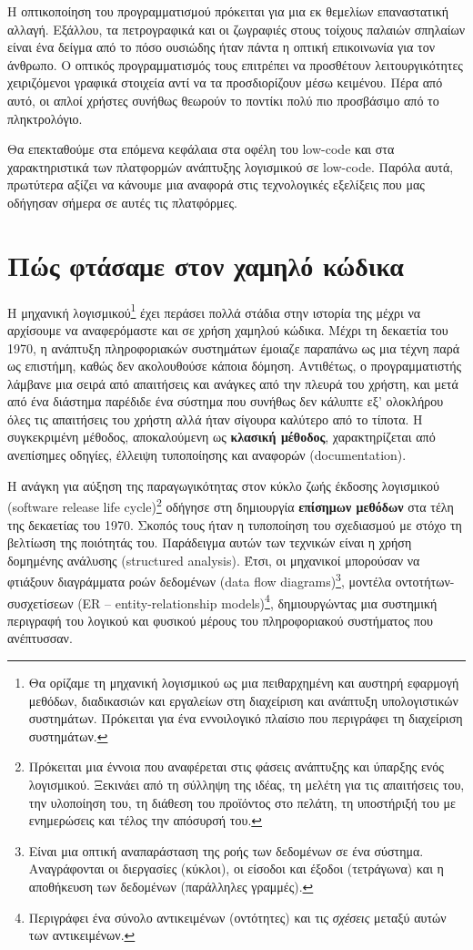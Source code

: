             Η οπτικοποίηση του προγραμματισμού πρόκειται για μια εκ θεμελίων επαναστατική αλλαγή. Εξάλλου, τα πετρογραφικά και οι ζωγραφιές στους τοίχους παλαιών σπηλαίων είναι ένα δείγμα από το πόσο ουσιώδης ήταν πάντα η οπτική επικοινωνία για τον άνθρωπο. \cite{CASEKuhn}  Ο οπτικός προγραμματισμός τους επιτρέπει να προσθέτουν λειτουργικότητες χειριζόμενοι γραφικά στοιχεία αντί να τα προσδιορίζουν μέσω κειμένου. Πέρα από αυτό, οι απλοί χρήστες συνήθως θεωρούν το ποντίκι πολύ πιο προσβάσιμο από το πληκτρολόγιο.

            Θα επεκταθούμε στα επόμενα κεφάλαια στα οφέλη του low-code και στα χαρακτηριστικά των πλατφορμών ανάπτυξης λογισμικού σε low-code. Παρόλα αυτά, πρωτύτερα αξίζει να κάνουμε μια αναφορά στις τεχνολογικές εξελίξεις που μας οδήγησαν σήμερα σε αυτές τις πλατφόρμες.


    \section{Πώς φτάσαμε στον χαμηλό κώδικα}
        Η μηχανική λογισμικού\footnote{Θα ορίζαμε τη μηχανική λογισμικού ως μια πειθαρχημένη και αυστηρή εφαρμογή μεθόδων, διαδικασιών και εργαλείων στη διαχείριση και ανάπτυξη υπολογιστικών συστημάτων. Πρόκειται για ένα εννοιλογικό πλαίσιο που περιγράφει τη διαχείριση συστημάτων.} έχει περάσει πολλά στάδια στην ιστορία της μέχρι να αρχίσουμε να αναφερόμαστε και σε χρήση χαμηλού κώδικα. Μέχρι τη δεκαετία του 1970, η ανάπτυξη πληροφοριακών συστημάτων έμοιαζε παραπάνω ως μια τέχνη παρά ως επιστήμη, καθώς δεν ακολουθούσε κάποια δόμηση. Αντιθέτως, ο προγραμματιστής λάμβανε μια σειρά από απαιτήσεις και ανάγκες από την πλευρά του χρήστη, και μετά από ένα διάστημα παρέδιδε ένα σύστημα που συνήθως δεν κάλυπτε εξ' ολοκλήρου όλες τις απαιτήσεις του χρήστη αλλά ήταν σίγουρα καλύτερο από το τίποτα. Η συγκεκριμένη μέθοδος, αποκαλούμενη ως \textbf{κλασική μέθοδος}, χαρακτηρίζεται από ανεπίσημες οδηγίες, έλλειψη τυποποίησης και αναφορών (documentation).

        Η ανάγκη για αύξηση της παραγωγικότητας στον κύκλο ζωής έκδοσης λογισμικού (software release life cycle)\footnote{Πρόκειται μια έννοια που αναφέρεται στις φάσεις ανάπτυξης και ύπαρξης ενός λογισμικού. Ξεκινάει από τη σύλληψη της ιδέας, τη μελέτη για τις απαιτήσεις του, την υλοποίηση του, τη διάθεση του προϊόντος στο πελάτη, τη υποστήριξή του με ενημερώσεις και τέλος την απόσυρσή του.} οδήγησε στη δημιουργία \textbf{επίσημων μεθόδων} στα τέλη της δεκαετίας του 1970. Σκοπός τους ήταν η τυποποίηση του σχεδιασμού με στόχο τη βελτίωση της ποιότητάς του. Παράδειγμα αυτών των τεχνικών είναι η χρήση δομημένης ανάλυσης (structured analysis). Έτσι, οι μηχανικοί μπορούσαν να φτιάξουν διαγράμματα ροών δεδομένων (data flow diagrams)\footnote{Είναι μια οπτική αναπαράσταση της ροής των δεδομένων σε ένα σύστημα. Αναγράφονται οι διεργασίες (κύκλοι), οι είσοδοι και έξοδοι (τετράγωνα) και η αποθήκευση των δεδομένων (παράλληλες γραμμές).}, μοντέλα οντοτήτων-συσχετίσεων (ER -- entity-relationship models)\footnote{Περιγράφει ένα σύνολο αντικειμένων (οντότητες) και τις \textit{σχέσεις} μεταξύ αυτών των αντικειμένων.}, δημιουργώντας μια συστημική περιγραφή του λογικού και φυσικού μέρους του πληροφοριακού συστήματος που ανέπτυσσαν.

